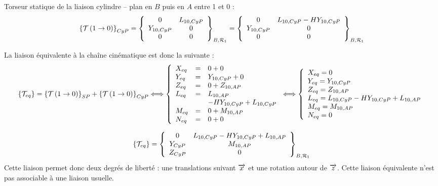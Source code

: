 \documentclass[10pt]{article}
\begin{document}
{\begin{corrige}
Torseur statique de la liaison cylindre -- plan en $B$ puis en $A$ entre 1 et 0 :
$$
\torseurstat{T}{1}{0}_{CyP}
=\torseurcol{0}{Y_{10,CyP}}{0}{L_{10,CyP}}{0}{0}{B,\mathcal{R}_1}
=\torseurcol{0}{Y_{10,CyP}}{0}{L_{10,CyP}-HY_{10,CyP}}{0}{0}{B,\mathcal{R}_1}
$$

La liaison équivalente à la chaîne cinématique est donc la suivante : 
$$\{\mathcal{T}_{eq}\}=\torseurstat{T}{1}{0}_{SP}+\torseurstat{T}{1}{0}_{CyP}
\Longleftrightarrow
\left\{
\begin{array}{lll}
X_{eq}&=&0+0\\
Y_{eq}&=&Y_{10,CyP}+0\\
Z_{eq}&=&0+Z_{10,AP}\\
L_{eq}&=&L_{10,AP}\\
&&-HY_{10,CyP}+L_{10,CyP}\\
M_{eq}&=&0+M_{10,AP}\\
N_{eq}&=&0+0\\
\end{array}
\right.
\Longleftrightarrow
\left\{
\begin{array}{l}
X_{eq}=0\\
Y_{eq}=Y_{10,CyP}\\
Z_{eq}=Z_{10,AP}\\
L_{eq}=L_{10,CyP}-HY_{10,CyP}+L_{10,AP}\\
M_{eq}=M_{10,AP}\\
N_{eq}=0\\
\end{array}
\right.
$$

$$
\{\mathcal{T}_{eq}\}=
\torseurcol{0}{Y_{CyP}}{Z_{CyP}}{L_{10,CyP}-HY_{10,CyP}+L_{10,AP}}{M_{10,AP}}{0}{B,\mathcal{R}_1}
$$
Cette liaison permet donc deux degrés de liberté : une translations suivant $\vect{x}$ et une rotation autour de $\vect{z}$. Cette liaison équivalente n'est pas associable à une liaison usuelle. 

\end{corrige}
}{}
\end{document}

